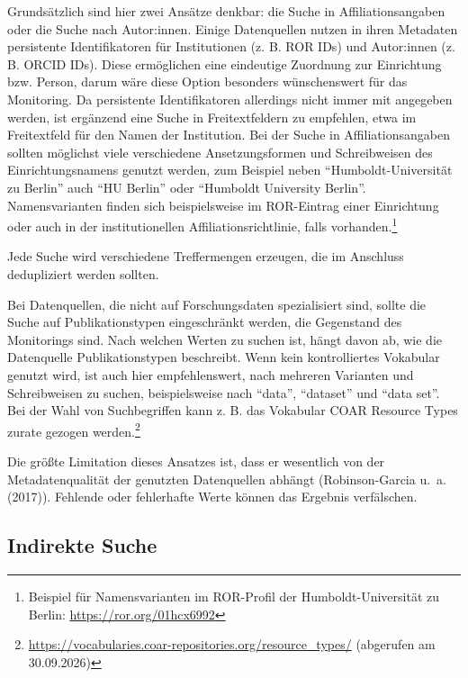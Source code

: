\documentclass[
  ngerman,
  letterpaper,
  DIV=11]{scrreprt}
\begin{document}
Grundsätzlich sind hier zwei Ansätze denkbar: die Suche in
Affiliationsangaben oder die Suche nach Autor:innen. Einige Datenquellen
nutzen in ihren Metadaten persistente Identifikatoren für Institutionen
(z. B. ROR IDs) und Autor:innen (z. B. ORCID IDs). Diese ermöglichen
eine eindeutige Zuordnung zur Einrichtung bzw. Person, darum wäre diese
Option besonders wünschenswert für das Monitoring. Da persistente
Identifikatoren allerdings nicht immer mit angegeben werden, ist
ergänzend eine Suche in Freitextfeldern zu empfehlen, etwa im
Freitextfeld für den Namen der Institution. Bei der Suche in
Affiliationsangaben sollten möglichst viele verschiedene
Ansetzungsformen und Schreibweisen des Einrichtungsnamens genutzt
werden, zum Beispiel neben ``Humboldt-Universität zu Berlin'' auch ``HU
Berlin'' oder ``Humboldt University Berlin''. Namensvarianten finden
sich beispielsweise im ROR-Eintrag einer Einrichtung oder auch in der
institutionellen Affiliationsrichtlinie, falls vorhanden.\footnote{Beispiel
  für Namensvarianten im ROR-Profil der Humboldt-Universität zu Berlin:
  \url{https://ror.org/01hcx6992}}

Jede Suche wird verschiedene Treffermengen erzeugen, die im Anschluss
dedupliziert werden sollten.

Bei Datenquellen, die nicht auf Forschungsdaten spezialisiert sind,
sollte die Suche auf Publikationstypen eingeschränkt werden, die
Gegenstand des Monitorings sind. Nach welchen Werten zu suchen ist,
hängt davon ab, wie die Datenquelle Publikationstypen beschreibt. Wenn
kein kontrolliertes Vokabular genutzt wird, ist auch hier
empfehlenswert, nach mehreren Varianten und Schreibweisen zu suchen,
beispielsweise nach ``data'', ``dataset'' und ``data set''. Bei der Wahl
von Suchbegriffen kann z. B. das Vokabular COAR Resource Types zurate
gezogen werden.\footnote{\url{https://vocabularies.coar-repositories.org/resource_types/}
  (abgerufen am 30.09.2026)}

Die größte Limitation dieses Ansatzes ist, dass er wesentlich von der
Metadatenqualität der genutzten Datenquellen abhängt (Robinson-Garcia
u.~a. (2017)). Fehlende oder fehlerhafte Werte können das Ergebnis
verfälschen.

\subsection{Indirekte Suche}\label{indirekte-suche}
\end{document}
